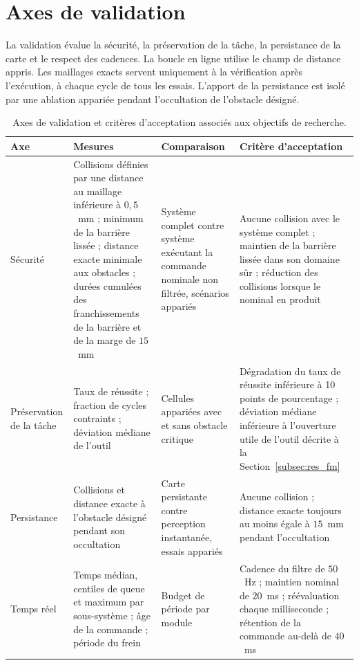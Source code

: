 \section{Axes de validation}
La validation évalue la sécurité, la préservation de la tâche, la persistance de la carte et le respect des cadences. La boucle en ligne utilise le champ de distance appris. Les maillages exacts servent uniquement à la vérification après l'exécution, à chaque cycle de tous les essais. L'apport de la persistance est isolé par une ablation appariée pendant l'occultation de l'obstacle désigné.

\begin{table}[htbp]
\centering
\caption{Axes de validation et critères d'acceptation associés aux objectifs de recherche.}
\label{tab:criteres_validation}
\small
\begin{tabular}{>{\raggedright\arraybackslash}p{2.2cm}>{\raggedright\arraybackslash}p{4.2cm}>{\raggedright\arraybackslash}p{3.4cm}>{\raggedright\arraybackslash}p{4.6cm}}
\hline
Axe & Mesures & Comparaison & Critère d'acceptation \\ \hline
Sécurité & Collisions définies par une distance au maillage inférieure à $0{,}5$~mm ; minimum de la barrière lissée ; distance exacte minimale aux obstacles ; durées cumulées des franchissements de la barrière et de la marge de $15$~mm & Système complet contre système exécutant la commande nominale non filtrée, scénarios appariés & Aucune collision avec le système complet ; maintien de la barrière lissée dans son domaine sûr ; réduction des collisions lorsque le nominal en produit \\ \addlinespace[0.3em] \hline \addlinespace[0.3em]
Préservation de la tâche & Taux de réussite ; fraction de cycles contraints ; déviation médiane de l'outil & Cellules appariées avec et sans obstacle critique & Dégradation du taux de réussite inférieure à 10 points de pourcentage ; déviation médiane inférieure à l'ouverture utile de l'outil décrite à la Section~\ref{subsec:res_fm} \\ \addlinespace[0.3em] \hline \addlinespace[0.3em]
Persistance & Collisions et distance exacte à l'obstacle désigné pendant son occultation & Carte persistante contre perception instantanée, essais appariés & Aucune collision ; distance exacte toujours au moins égale à $15$~mm pendant l'occultation \\ \addlinespace[0.3em] \hline \addlinespace[0.3em]
Temps réel & Temps médian, centiles de queue et maximum par sous-système ; âge de la commande ; période du frein & Budget de période par module & Cadence du filtre de $50$~Hz ; maintien nominal de $20$~ms ; réévaluation chaque milliseconde ; rétention de la commande au-delà de $40$~ms \\ \hline
\end{tabular}
\end{table}
\FloatBarrier


